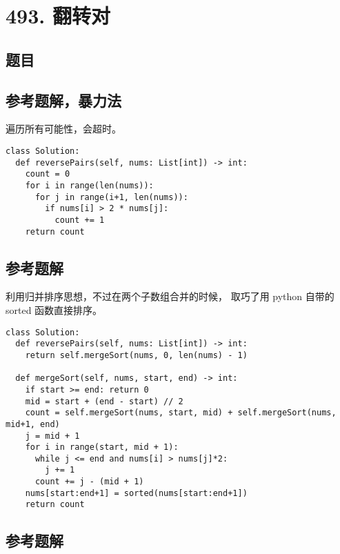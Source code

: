 \newpage
\section{493. 翻转对}
\label{leetcode:493}

\subsection{题目}

\subsection{参考题解，暴力法}

遍历所有可能性，会超时。

\begin{verbatim}
class Solution:
  def reversePairs(self, nums: List[int]) -> int:
    count = 0
    for i in range(len(nums)):
      for j in range(i+1, len(nums)):
        if nums[i] > 2 * nums[j]:
          count += 1
    return count
\end{verbatim}

\subsection{参考题解}

利用归并排序思想，不过在两个子数组合并的时候，
取巧了用 python 自带的 sorted 函数直接排序。

\begin{verbatim}
class Solution:
  def reversePairs(self, nums: List[int]) -> int:
    return self.mergeSort(nums, 0, len(nums) - 1)

  def mergeSort(self, nums, start, end) -> int:
    if start >= end: return 0
    mid = start + (end - start) // 2
    count = self.mergeSort(nums, start, mid) + self.mergeSort(nums, mid+1, end)
    j = mid + 1
    for i in range(start, mid + 1):
      while j <= end and nums[i] > nums[j]*2:
        j += 1
      count += j - (mid + 1)
    nums[start:end+1] = sorted(nums[start:end+1])
    return count
\end{verbatim}

\subsection{参考题解}

\begin{verbatim}

\end{verbatim}
